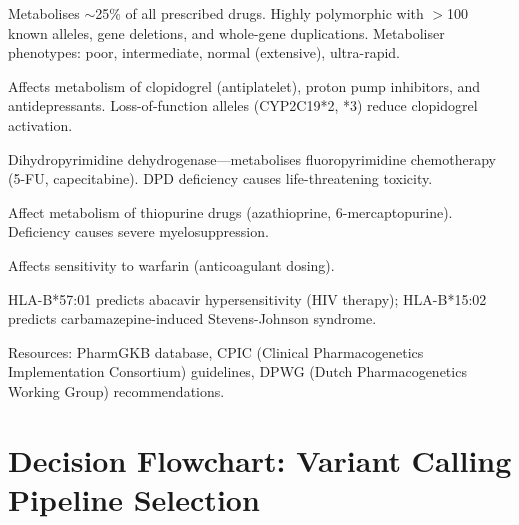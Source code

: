 \begin{keyconcept}[title={Key Pharmacogenes}]
\begin{description}[nosep]
  \item[\gene{CYP2D6}] Metabolises $\sim$25\% of all prescribed drugs. Highly polymorphic with $>$100 known alleles, gene deletions, and whole-gene duplications. Metaboliser phenotypes: poor, intermediate, normal (extensive), ultra-rapid.
  \item[\gene{CYP2C19}] Affects metabolism of clopidogrel (antiplatelet), proton pump inhibitors, and antidepressants. Loss-of-function alleles (CYP2C19*2, *3) reduce clopidogrel activation.
  \item[\gene{DPYD}] Dihydropyrimidine dehydrogenase---metabolises fluoropyrimidine chemotherapy (5-FU, capecitabine). DPD deficiency causes life-threatening toxicity.
  \item[\gene{TPMT}/\gene{NUDT15}] Affect metabolism of thiopurine drugs (azathioprine, 6-mercaptopurine). Deficiency causes severe myelosuppression.
  \item[\gene{VKORC1}] Affects sensitivity to warfarin (anticoagulant dosing).
  \item[\gene{HLA-B}] HLA-B*57:01 predicts abacavir hypersensitivity (HIV therapy); HLA-B*15:02 predicts carbamazepine-induced Stevens-Johnson syndrome.
\end{description}
Resources: PharmGKB database, CPIC (Clinical Pharmacogenetics Implementation Consortium) guidelines, DPWG (Dutch Pharmacogenetics Working Group) recommendations.
\end{keyconcept}

\section{Decision Flowchart: Variant Calling Pipeline Selection}
\label{sec:pipeline_decision}

